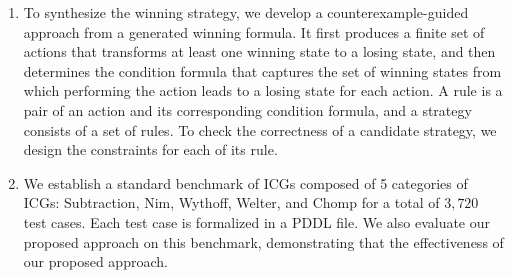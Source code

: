 \documentclass[review]{elsarticle}
\begin{document}
\begin{enumerate}
	\item To synthesize the winning strategy, we develop a counterexample-guided approach from a generated winning formula.
	It first produces a finite set of actions that transforms at least one winning state to a losing state, and then determines the condition formula that captures the set of winning states from which performing the action leads to a losing state for each action.
	A rule is a pair of an action and its corresponding condition formula, and a strategy consists of a set of rules.
	To check the correctness of a candidate strategy, we design the constraints for each of its rule.
		
	\item We establish a standard benchmark of ICGs composed of 5 categories of ICGs: Subtraction, Nim, Wythoff, Welter, and Chomp for a total of $3,720$ test cases.
	Each test case is formalized in a PDDL file.
	We also evaluate our proposed approach on this benchmark, demonstrating that the effectiveness of our proposed approach.
%	
%	
\end{enumerate}


\end{document}
